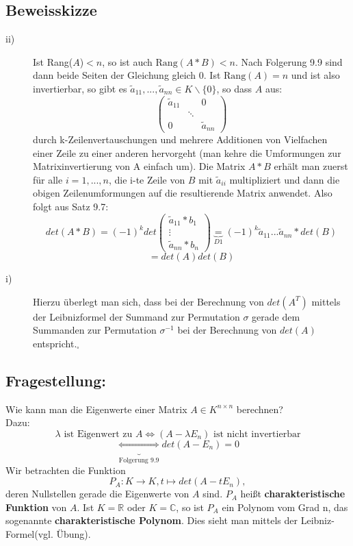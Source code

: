 \documentclass{scrbook}
\begin{document}
\subsection*{Beweisskizze}
\begin{description}
\item[ii)] Ist Rang($A$)$<n$, so ist auch $\text{Rang}(A*B)<n$. Nach Folgerung 9.9 sind dann beide Seiten der Gleichung gleich 0. Ist $\text{Rang}(A) = n$ und ist also invertierbar, so gibt es $\tilde{a}_{11},...,\tilde{a}_{nn} \in K\backslash \{0\}$, so dass $A$ aus:\[\left(
\begin{array}{ccc}
\tilde{a}_{11}&&0\\
&\ddots&\\
0&&\tilde{a}_{nn}
\end{array}
\right)\]
durch k-Zeilenvertauschungen und mehrere Additionen von Vielfachen einer Zeile zu einer anderen hervorgeht (man kehre die Umformungen zur Matrixinvertierung von A einfach um). Die Matrix $A*B$ erhält man zuerst für alle $i=1,...,n$, die i-te Zeile von $B$ mit $\tilde{a}_{ii}$ multipliziert und dann die obigen Zeilenumformungen auf die resultierende Matrix anwendet. Also folgt aus Satz 9.7:
\[det(A*B) = (-1)^k det\left(
\begin{array}{c}
\tilde{a}_{11}*b_1\\
\vdots\\
\tilde{a}_{nn}*b_n
\end{array}
\right) \underbrace{=}_{D1} (-1)^k \tilde{a}_{11}...\tilde{a}_{nn}*det(B)\]
\[=det(A)det(B)\]
\item[i)] Hierzu überlegt man sich, dass bei der Berechnung von $det(A^T)$ mittels der Leibnizformel der Summand zur Permutation $\sigma$ gerade dem Summanden zur Permutation $\sigma^{-1}$ bei der Berechnung von $det(A)$ entspricht.$_\square$
\end{description}
\subsection*{Fragestellung:} Wie kann man die Eigenwerte einer Matrix $A\in K^{n\times n}$ berechnen?\\
Dazu:
\[\lambda \text{ ist Eigenwert zu }A \Leftrightarrow (A-\lambda E_n) \text{ ist nicht invertierbar}\]
\[\underbrace{\Leftrightarrow}_{\text{Folgerung 9.9}} det(A-E_n)=0\]
Wir betrachten die Funktion
\[P_A:K\to K, t\mapsto det(A-tE_n),\]
deren Nullstellen gerade die Eigenwerte von $A$ sind. $P_A$ heißt \textbf{charakteristische Funktion} von $A$. Ist $K = \mathbb{R}$ oder $K=\mathbb{C}$, so ist $P_A$ ein Polynom vom Grad n, das sogenannte \textbf{charakteristische Polynom}. Dies sieht man mittels der Leibniz-Formel(vgl. Übung).
\end{document}
